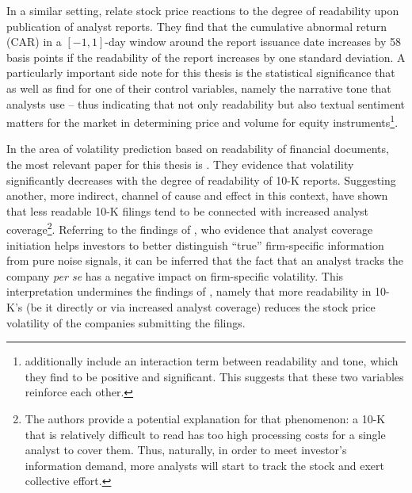 In a similar setting, \textcite{HsiehHuiZhang2016} relate stock price reactions to the degree of readability upon publication of analyst reports. They find that the cumulative abnormal return (CAR) in a $[-1,1]$-day window around the report issuance date increases by 58 basis points if the readability of the report increases by one standard deviation. A particularly important side note for this thesis is the statistical significance that \textcite{HsiehHuiZhang2016} as well as \textcite{DeFranco2015} find for one of their control variables, namely the narrative tone that analysts use -- thus indicating that not only readability but also textual sentiment matters for the market in determining price and volume for equity instruments\footnote{\textcite{DeFranco2015} additionally include an interaction term between readability and tone, which they find to be positive and significant. This suggests that these two variables reinforce each other.}.



In the area of volatility prediction based on readability of financial documents, the most relevant paper for this thesis is \textcite{Loughran2014}. They evidence that volatility significantly decreases with the degree of readability of 10-K reports. Suggesting another, more indirect, channel of cause and effect in this context, \textcite{LehavyLiMerkley2011} have shown that less readable 10-K filings tend to be connected with increased analyst coverage\footnote{The authors provide a potential explanation for that phenomenon: a 10-K that is relatively difficult to read has too high processing costs for a single analyst to cover them. Thus, naturally, in order to meet investor's information demand, more analysts will start to track the stock and exert collective effort.}. Referring to the findings of \textcite{Schutte2007}, who evidence that analyst coverage initiation helps investors to better distinguish \enquote{true} firm-specific information from pure noise signals, it can be inferred that the fact that an analyst tracks the company \textit{per se} has a negative impact on firm-specific volatility. This interpretation undermines the findings of \textcite{Loughran2014}, namely that more readability in 10-K's (be it directly or via increased analyst coverage) reduces the stock price volatility of the companies submitting the filings.


